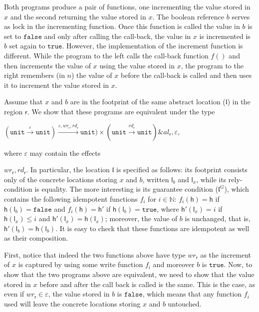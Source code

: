 \documentclass[orivec]{llncs}
\newif\iffull\fullfalse
\newcommand{\keywd}[1]{\mathtt{#1}}
\newcommand{\effto}[1]{\stackrel{#1}{\to}}
\newcommand{\mtrue}{\keywd{true}}
\newcommand{\mfalse}{\keywd{false}}
\newcommand{\unittype}{\keywd{unit}}
\newcommand{\eff}{\varepsilon}
\newcommand{\regid}{\ensuremath{\mathsf{r}}}
\newcommand{\aEff}[1]{\ensuremath{\mathit{al}_{#1}}}
\newcommand{\rEff}[1]{\ensuremath{\mathit{rd}_{#1}}}
\newcommand{\wEff}[1]{\ensuremath{\mathit{wr}_{#1}}}
\newcommand{\loc}{\mathfrak{l}}
\newcommand{\cloc}{\ensuremath{\mathsf{l}}\xspace}
\newcommand\heap{\ensuremath{\mathsf{h}}\xspace}
\newcommand{\ety}[2]{{#1}\mathrel{\&}{#2}}
\begin{document}
\noindent
\fi
Both programs produce a pair of functions, one incrementing the
value stored in $x$ and the second returning the value stored in $x$.
The boolean reference $b$ serves as lock in the
incrementing function. 
Once this function is called the value in $b$ is set to
$\mfalse$ and only after calling the call-back, the value in
$x$ is incremented is $b$ set again to $\mtrue$. However, the
implementation of 
the increment function is different. While the program to the 
left calls the call-back function $f()$ and then increments the value of
$x$ using the value stored in $x$, the program to the right remembers (in
$n$) the value of $x$ before the call-back is called and then uses it to
increment the value stored in $x$. 

Assume that $x$ and $b$ are in the footprint of the same abstract location
($\loc$) in the
region $\regid$. We show that these programs are equivalent under the type
\iffull
\[
\ety{(\unittype \effto{\eff} \unittype) \effto{\eff, \wEff{\regid},
\rEff{\regid}} \unittype) \times (\unittype \effto{\rEff{\regid}}
\unittype)}{\aEff{\regid}, \eff},
\]
 where $\eff$ may contain the effects
\else

\(
\ety{(\unittype \effto{\eff} \unittype) \effto{\eff, \wEff{\regid},
\rEff{\regid}} \unittype) \times (\unittype \effto{\rEff{\regid}}
\unittype)}{\aEff{\regid}, \eff},
\)

\noindent
 where $\eff$ may contain the effects
\fi
$\wEff{\regid}, \rEff{\regid}$. In particular, the location $\loc$ is
specified as follows: its footprint consists only of the concrete
locations storing $x$ and $b$, written $\cloc_b$ and $\cloc_x$, while its
rely-condition is equality. The more interesting is its guarantee condition
($\loc^G$), which contains 
the following idempotent functions $f_i$ for $i \in \mathbb{N}$:
$f_i(\heap) = \heap$ if $\heap(\cloc_b) = \mfalse$ and $f_i(\heap) =
\heap'$ if $\heap(\cloc_b) = \mtrue$, where $\heap'(\cloc_x) = i$ if
$\heap(\cloc_x) \leq i$ and $\heap'(\cloc_x) = \heap(\cloc_x)$; 
moreover, the value of $b$ is unchanged, that is, $\heap'(\cloc_b) =
\heap(\cloc_b)$.
It is easy to check that these functions are idempotent as well as their
composition. 

First, notice that indeed the two functions above have type $\wEff{\regid}$
as the increment of $x$ is captured by using some write function
$f_i$
and moreover $b$ is $\mtrue$. Now, to show that the two programs above
are equivalent, we need to show that the value stored in $x$ before and
after the call back is called is the same. This is the case, as even if
$\wEff{\regid} \in \eff$, the value stored in $b$ is $\mfalse$, which means
that any function $f_i$ used will leave the concrete locations storing $x$
and $b$ untouched.
\end{document}
